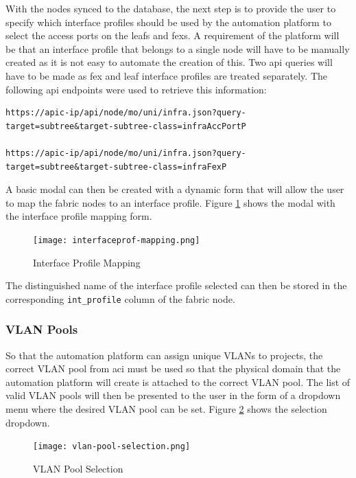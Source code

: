 With the nodes synced to the database, the next step is to provide the user to specify which interface profiles should be used by the automation platform to select the access ports on the leafs and \gls{fex}s. A requirement of the platform will be that an interface profile that belongs to a single node will have to be manually created as it is not easy to automate the creation of this. Two \gls{api} queries will have to be made as \gls{fex} and leaf interface profiles are treated separately. The following \gls{api} endpoints were used to retrieve this information:
\begin{verbatim}
https://apic-ip/api/node/mo/uni/infra.json?query-
target=subtree&target-subtree-class=infraAccPortP

https://apic-ip/api/node/mo/uni/infra.json?query-
target=subtree&target-subtree-class=infraFexP
\end{verbatim}

A basic modal can then be created with a dynamic form that will allow the user to map the fabric nodes to an interface profile. Figure \ref{fig:interfaceprof-mapping} shows the modal with the interface profile mapping form.

\begin{figure}[H]
    \centering
    \texttt{[image: interfaceprof-mapping.png]}
    \caption{Interface Profile Mapping}
    \label{fig:interfaceprof-mapping}
\end{figure}

The distinguished name of the interface profile selected can then be stored in the corresponding \verb|int_profile| column of the fabric node.

\subsubsection{VLAN Pools}
So that the automation platform can assign unique VLANs to projects, the correct VLAN pool from \gls{aci} must be used so that the physical domain that the automation platform will create is attached to the correct VLAN pool. The list of valid VLAN pools will then be presented to the user in the form of a dropdown menu where the desired VLAN pool can be set. Figure \ref{fig:vlan-pool-selection} shows the selection dropdown.

\begin{figure}[H]
    \centering
    \texttt{[image: vlan-pool-selection.png]}
    \caption{VLAN Pool Selection}
    \label{fig:vlan-pool-selection}
\end{figure}

